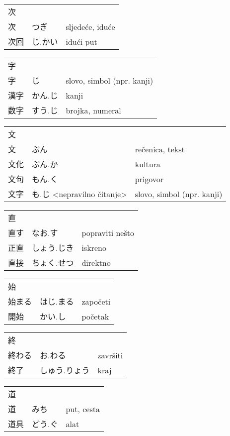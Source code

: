 

\newenvironment{dictentry}[1]{
	\begin{tabular}{p{2cm} p{3cm} p{10cm}}
		#1 &&\\
}{
	\end{tabular}
	\vspace{20pt}
}

\newcommand{\example}[3]{
	\hspace*{\fill}#1 & #2 & #3\\
}

\author{ロボット君}


\begin{dictentry}{次}
\example{次}{つぎ}{sljedeće, iduće}
\example{次回}{じ.かい}{idući put}
\end{dictentry}

\begin{dictentry}{字}
\example{字}{じ}{slovo, simbol (npr. kanji)}
\example{漢字}{かん.じ}{kanji}
\example{数字}{すう.じ}{brojka, numeral}
\end{dictentry}

\begin{dictentry}{文}
\example{文}{ぶん}{rečenica, tekst}
\example{文化}{ぶん.か}{kultura}
\example{文句}{もん.く}{prigovor}
\example{文字}{も.じ <nepravilno čitanje>}{slovo, simbol (npr. kanji)}
\end{dictentry}

\begin{dictentry}{直}
\example{直す}{なお.す}{popraviti nešto}
\example{正直}{しょう.じき}{iskreno}
\example{直接}{ちょく.せつ}{direktno}
\end{dictentry}

\begin{dictentry}{始}
\example{始まる}{はじ.まる}{započeti}
\example{開始}{かい.し}{početak}
\end{dictentry}

\begin{dictentry}{終}
\example{終わる}{お.わる}{završiti}
\example{終了}{しゅう.りょう}{kraj}
\end{dictentry}

\begin{dictentry}{道}
\example{道}{みち}{put, cesta}
\example{道具}{どう.ぐ}{alat}
\end{dictentry}

